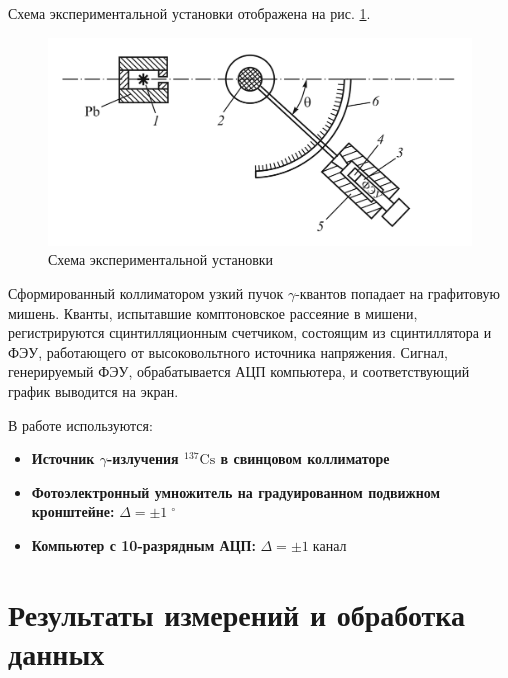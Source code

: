 \documentclass[a4paper]{article}
\newcommand{\isotope}[2]{$ ^{#2}\mathrm{#1} $}
\newcommand{\gmm}{$\gamma $}
\newcommand{\Equip}[3]{
	
	\item{\bf #1:} $\Delta = \pm #2\; #3$}
\newcommand{\equip}[1]{
	
	\item{\bf #1}}
\begin{document}
	Схема экспериментальной установки отображена на рис. \ref{fig:screenshot2}.	
	\begin{figure}
		\centering
		\includegraphics[width=0.7\linewidth]{Screenshot_2}
		\caption{Схема экспериментальной установки}
		\label{fig:screenshot2}
	\end{figure}
	Сформированный коллиматором узкий пучок \gmm-квантов попадает на графитовую мишень. Кванты, испытавшие комптоновское рассеяние в мишени, регистрируются сцинтилляционным счетчиком, состоящим из сцинтиллятора и ФЭУ, работающего от высоковольтного источника напряжения. Сигнал, генерируемый ФЭУ, обрабатывается АЦП компьютера, и соответствующий график выводится на экран.
		
	В работе используются:
	\begin{itemize}
		\equip{Источник \gmm-излучения \isotope{Cs}{137} в свинцовом коллиматоре}
		\Equip{Фотоэлектронный умножитель на градуированном подвижном кронштейне}{1}{^\circ}
		\Equip{Компьютер с 10-разрядным АЦП}{1}{канал}
	\end{itemize}
	
	\section{Результаты измерений и обработка данных}
	
\end{document}
